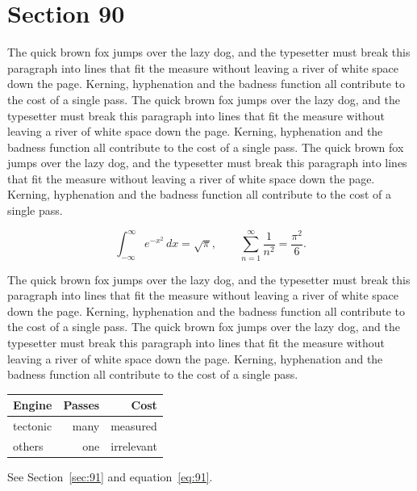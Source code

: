 \documentclass{article}
\begin{document}
\section{Section 90}
\label{sec:90}
The quick brown fox jumps over the lazy dog, and the typesetter must break this paragraph into lines that fit the measure without leaving a river of white space down the page. Kerning, hyphenation and the badness function all contribute to the cost of a single pass. The quick brown fox jumps over the lazy dog, and the typesetter must break this paragraph into lines that fit the measure without leaving a river of white space down the page. Kerning, hyphenation and the badness function all contribute to the cost of a single pass. The quick brown fox jumps over the lazy dog, and the typesetter must break this paragraph into lines that fit the measure without leaving a river of white space down the page. Kerning, hyphenation and the badness function all contribute to the cost of a single pass. 

\begin{equation}\label{eq:90}
\int_{-\infty}^{\infty} e^{-x^{2}}\,dx = \sqrt{\pi}, \qquad
\sum_{n=1}^{\infty} \frac{1}{n^{2}} = \frac{\pi^{2}}{6}.
\end{equation}

The quick brown fox jumps over the lazy dog, and the typesetter must break this paragraph into lines that fit the measure without leaving a river of white space down the page. Kerning, hyphenation and the badness function all contribute to the cost of a single pass. The quick brown fox jumps over the lazy dog, and the typesetter must break this paragraph into lines that fit the measure without leaving a river of white space down the page. Kerning, hyphenation and the badness function all contribute to the cost of a single pass. 

\begin{center}
\begin{tabular}{lrr}
\toprule
Engine & Passes & Cost \\
\midrule
tectonic & many & measured \\
others & one & irrelevant \\
\bottomrule
\end{tabular}
\end{center}

See Section~\ref{sec:91} and equation~\eqref{eq:91}.
\end{document}
